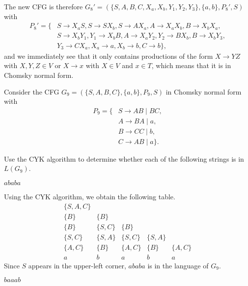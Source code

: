 \documentclass{exercise}
\begin{document}
\begin{solution}
\begin{enumerate}[label=\Roman*.]
        The new CFG is therefore $G_8'=(\{S,A,B,C,X_a,X_b,Y_1,Y_2,Y_3\},\{a,b\},P_8',S)$ with
        \begin{align*}
          P_8' = \{ & S \to X_aS, S \to SX_b, S\to AX_a, A\to X_aX_b, B\to X_bX_a,\\
                    & S \to X_bY_1, Y_1 \to X_bB, A \to X_aY_2, Y_2 \to BX_b, B \to X_bY_3,\\
                    & Y_3 \to CX_a, X_a \to a, X_b \to b, C\to b\},
        \end{align*}
        and we immediately see that it only contains productions of the form $X \to YZ$ with
        $X,Y,Z\in V$ or $X \to x$ with $X\in V$ and $x\in T$, which means that it is in
        Chomsky normal form.
    \end{enumerate}
  \end{solution}


Consider the CFG $G_9=(\{S,A,B,C\},\{a,b\},P_9,S)$ in Chomsky normal form with
\begin{align*}
  P_9 = \{ & S \to AB \mid BC,\\
           & A \to BA \mid a,\\
           & B \to CC \mid b,\\
           & C \to AB \mid a\}.
\end{align*}

Use the CYK algorithm to determine whether each of the following strings is in $L(G_9)$.
  
\subtask $ababa$
 
  \begin{solution}
    Using the CYK algorithm, we obtain the following table.
    \[\begin{array}{|ccccc}
    \{S,A,C\} &&&&\\
    \{B\} & \{B\} &&&\\
    \{B\} & \{S,C\} & \{B\} &&\\
    \{S,C\} & \{S,A\} & \{S,C\} & \{S,A\}\\
    \{A,C\} & \{B\} & \{A,C\} & \{B\} & \{A,C\}\\
    \hline
    a & b & a & b & a
    \end{array}\]
    Since $S$ appears in the upper-left corner, $ababa$ is in the language of $G_9$.
  \end{solution}

\enlargethispage{20mm}
\subtask $baaab$
  
\end{document}
